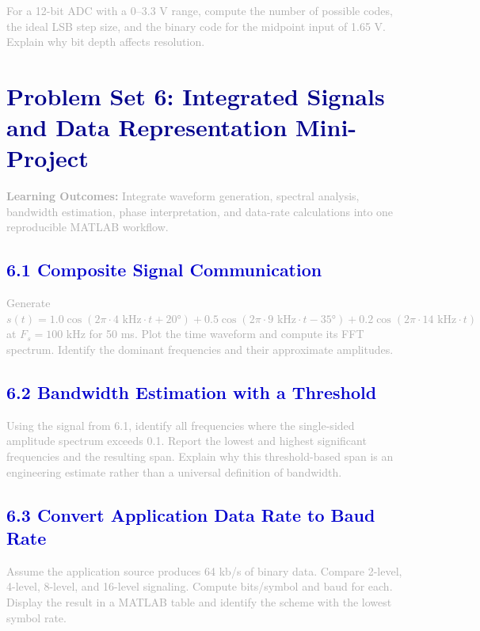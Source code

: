 \documentclass[12pt,a4paper]{article}
\begin{document}
\textcolor{darkgray}{
For a 12-bit ADC with a 0--3.3 V range, compute the number of possible codes, the ideal LSB step size, and the binary code for the midpoint input of 1.65 V. Explain why bit depth affects resolution.
}

\newpage

\section*{\LARGE\textbf{\textcolor{darkblue}{Problem Set 6: Integrated Signals and Data Representation Mini-Project}}}

\textcolor{darkgray}{\textbf{Learning Outcomes:} Integrate waveform generation, spectral analysis, bandwidth estimation, phase interpretation, and data-rate calculations into one reproducible MATLAB workflow.}

\subsection*{\large\textbf{\textcolor{mediumblue}{6.1 Composite Signal Communication}}}

\textcolor{darkgray}{
Generate $s(t) = 1.0 \cos(2\pi \cdot 4 \text{ kHz} \cdot t + 20°) + 0.5 \cos(2\pi \cdot 9 \text{ kHz} \cdot t - 35°) + 0.2 \cos(2\pi \cdot 14 \text{ kHz} \cdot t)$ at $F_s = 100$ kHz for 50 ms. Plot the time waveform and compute its FFT spectrum. Identify the dominant frequencies and their approximate amplitudes.
}

\subsection*{\large\textbf{\textcolor{mediumblue}{6.2 Bandwidth Estimation with a Threshold}}}

\textcolor{darkgray}{
Using the signal from 6.1, identify all frequencies where the single-sided amplitude spectrum exceeds 0.1. Report the lowest and highest significant frequencies and the resulting span. Explain why this threshold-based span is an engineering estimate rather than a universal definition of bandwidth.
}

\subsection*{\large\textbf{\textcolor{mediumblue}{6.3 Convert Application Data Rate to Baud Rate}}}

\textcolor{darkgray}{
Assume the application source produces 64 kb/s of binary data. Compare 2-level, 4-level, 8-level, and 16-level signaling. Compute bits/symbol and baud for each. Display the result in a MATLAB table and identify the scheme with the lowest symbol rate.
}
\end{document}
